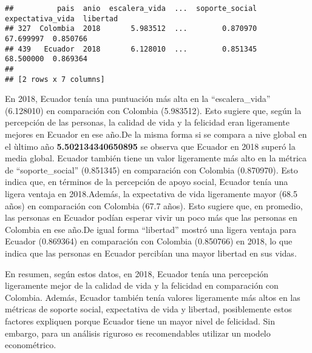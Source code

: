 \documentclass[
]{article}
\begin{document}
\begin{verbatim}
##          pais  anio  escalera_vida  ...  soporte_social  expectativa_vida  libertad
## 327  Colombia  2018       5.983512  ...        0.870970         67.699997  0.850766
## 439   Ecuador  2018       6.128010  ...        0.851345         68.500000  0.869364
## 
## [2 rows x 7 columns]
\end{verbatim}

En 2018, Ecuador tenía una puntuación más alta en la ``escalera\_vida''
(6.128010) en comparación con Colombia (5.983512). Esto sugiere que,
según la percepción de las personas, la calidad de vida y la felicidad
eran ligeramente mejores en Ecuador en ese año.De la misma forma si se
compara a nive global en el ùltimo año \textbf{5.502134340650895} se
observa que Ecuador en 2018 superó la media global. Ecuador también
tiene un valor ligeramente más alto en la métrica de ``soporte\_social''
(0.851345) en comparación con Colombia (0.870970). Esto indica que, en
términos de la percepción de apoyo social, Ecuador tenía una ligera
ventaja en 2018.Además, la expectativa de vida ligeramente mayor (68.5
años) en comparación con Colombia (67.7 años). Esto sugiere que, en
promedio, las personas en Ecuador podían esperar vivir un poco más que
las personas en Colombia en ese año.De igual forma ``libertad'' mostró
una ligera ventaja para Ecuador (0.869364) en comparación con Colombia
(0.850766) en 2018, lo que indica que las personas en Ecuador percibían
una mayor libertad en sus vidas.

En resumen, según estos datos, en 2018, Ecuador tenía una percepción
ligeramente mejor de la calidad de vida y la felicidad en comparación
con Colombia. Además, Ecuador también tenía valores ligeramente más
altos en las métricas de soporte social, expectativa de vida y libertad,
posiblemente estos factores expliquen porque Ecuador tiene un mayor
nivel de felicidad. Sin embargo, para un análisis riguroso es
recomendables utilizar un modelo econométrico.
\end{document}
